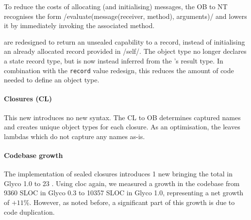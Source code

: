 \documentclass[main.tex]{subfiles}
\begin{document}
To reduce the costs of allocating (and initialising) messages, the OB to NT  recognises the form \iil/evaluate(message(receiver, method), arguments)/ and lowers it by immediately invoking the associated method.

 are redesigned to return an unsealed capability to a record, instead of initialising an already allocated record provided in \iil/self/. The object type no longer declares a state record type, but is now instead inferred from the 's result type. In combination with the \texttt{record} value redesign, this reduces the amount of code needed to define an object type.

\paragraph{Closures (CL)} This new  introduces no new syntax. The CL to OB  determines captured names and creates unique object types for each closure. As an optimisation, the  leaves lambdas which do not capture any names as-is.

\paragraph{Codebase growth} The implementation of sealed closures introduces 1 new  bringing the total in Glyco 1.0 to 23 . Using cloc again, we measured a growth in the codebase from 9360 SLOC in Glyco 0.3 to 10357 SLOC in Glyco 1.0, representing a net growth of $+11\%$. However, as noted before, a significant part of this growth is due to code duplication.

\onlyinsubfile{\glsaddall\printglossaries}
\end{document}
